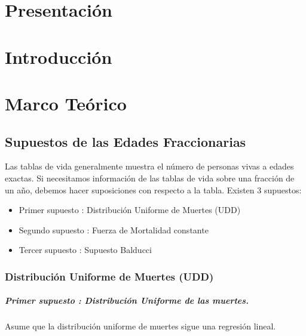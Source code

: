 \documentclass[12pt]{report}
\begin{document}


\tableofcontents  



\chapter{Presentaci\'on}

\chapter{Introducci\'on}

\chapter{Marco Te\'orico}

\section{Supuestos de las Edades Fraccionarias}
\setcounter{equation}{0}

Las tablas de vida generalmente muestra el n\'umero de personas vivas a edades exactas. Si necesitamos informaci\'on de las tablas de vida sobre una fracci\'on de un a\~no, debemos hacer suposiciones con respecto a la tabla. Existen 3 supuestos:

\begin{itemize}
\item Primer supuesto : Distribuci\'on Uniforme de Muertes (UDD)
\item Segundo supuesto : Fuerza de Mortalidad constante
\item Tercer supuesto : Supuesto Balducci
\end{itemize}


\subsection{Distribuci\'on Uniforme de Muertes (UDD)}

\paragraph{Primer supuesto : \textit{Distribuci\'on Uniforme de las muertes.}}
Asume que la distribuci\'on uniforme de muertes sigue una regresi\'on lineal.

\end{document}
